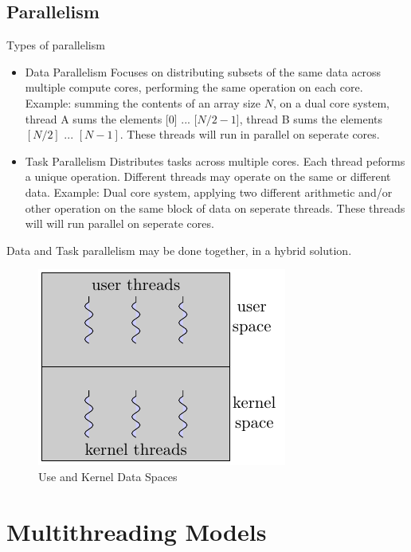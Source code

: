 \documentclass{book/custombook}
\begin{document}
            \subsection{Parallelism}
                Types of parallelism
                \begin{itemize}
                    \item Data Parallelism
                        \subitem Focuses on distributing subsets of the same data across multiple compute cores, performing the same operation on each core.
                        \subitem Example: summing the contents of an array size $N$, on a dual core system, thread A sums the elements [0] ... [$N/2 - 1$], thread B
                        sums the elements $[N/2]$ ... $[N-1]$. These threads will run in parallel on seperate cores.
                    \item Task Parallelism
                        \subitem Distributes tasks across multiple cores. Each thread peforms a unique operation. Different threads may operate on the same or different
                        data.
                        \subitem Example: Dual core system, applying two different arithmetic and/or other operation on the same block of data on seperate threads. These
                        threads will will run parallel on seperate cores.
                \end{itemize}
                Data and Task parallelism may be done together, in a hybrid solution.
                \begin{figure}[H]
                    \centering
                    \includegraphics{figures/data_spaces.pdf}
                    \caption{Use and Kernel Data Spaces}
                \end{figure}
        \section{Multithreading Models}
\end{document}
